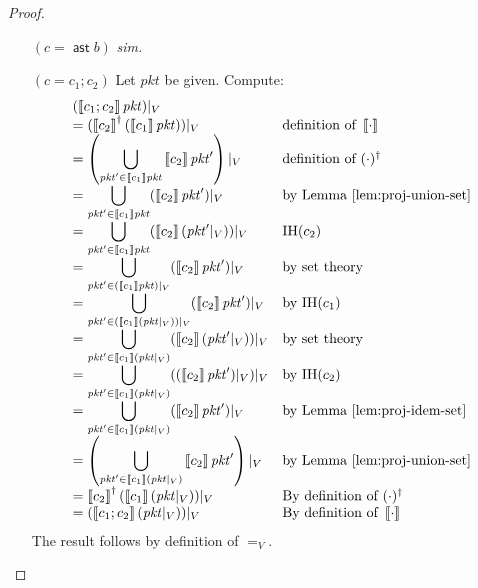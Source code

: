 \documentclass{article}
\newcommand{\pkt}{\mathit{pkt}}
\newcommand{\denote}[1]{\left\llbracket#1\right\rrbracket}
\newcommand{\assert}{\mathop{\mathsf{ast}}}
\theoremstyle{plain}
\theoremstyle{definition}
\theoremstyle{remark}
\begin{document}
\begin{proof}
\begin{enumerate}[align=left]
  \item[$(c = \assert b)$] \textit{sim.}
  \item[$(c = c_1;c_2)$] Let $\pkt$ be given. Compute:
    \[\begin{array}{>{\displaystyle}ll}
    (\denote{c_1;c_2}\pkt)|_V \\
    = (\denote{c_2}^\dagger(\denote{c_1}\pkt))|_V
    & \text{definition of }\denote\cdot \\
    = \left(\bigcup_{\pkt' \in \denote{c_1} \pkt} \denote{c_2}\pkt'\right)|_V
    & \text{definition of }(\cdot)^\dagger \\
    = \bigcup_{\pkt' \in \denote{c_1} \pkt} (\denote{c_2}\pkt')|_V
    & \text{by Lemma~\ref{lem:proj-union-set}} \\
    = \bigcup_{\pkt' \in \denote{c_1}\pkt} (\denote{c_2}(\pkt'|_V))|_V
    & \text{IH}(c_2)  \\
    =\bigcup_{\pkt' \in (\denote{c_1}\pkt)|_V} (\denote{c_2} \pkt')|_V
    & \text{by set theory} \\
    = \bigcup_{\pkt' \in (\denote{c_1}(\pkt|_V))|_V} (\denote{c_2} \pkt')|_V
    & \text{by IH}(c_1) \\
    = \bigcup_{\pkt' \in \denote{c_1}(\pkt|_V)} (\denote{c_2} (\pkt'|_V))|_V
    & \text{by set theory} \\
    = \bigcup_{\pkt' \in \denote{c_1}(\pkt|_V)} ((\denote{c_2} \pkt')|_V)|_V
    & \text{by IH}(c_2) \\
    = \bigcup_{\pkt' \in \denote{c_1}(\pkt|_V)} (\denote{c_2} \pkt')|_V
    & \text{by Lemma~\ref{lem:proj-idem-set}} \\
    = \left(\bigcup_{\pkt' \in \denote{c_1}(\pkt|_V)} \denote{c_2}\pkt'\right)|_V
    & \text{by Lemma~\ref{lem:proj-union-set}} \\
    = \denote{c_2}^\dagger(\denote{c_1}(\pkt|_V))|_V
    & \text{By definition of }(\cdot)^\dagger\\
    = (\denote{c_1;c_2}(\pkt|_V))|_V
    & \text{By definition of }\denote\cdot
    \end{array}\]
    The result follows by definition of $=_V$.


\end{enumerate}
\end{proof}
\end{document}
